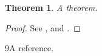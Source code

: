 \documentclass{article}
\newtheorem{theorem}{Theorem}
\begin{document}
\begin{theorem}\label{t}A theorem.\end{theorem}
\begin{proof}
  See \cite[pp.~23--27]{knuth}, \cite[Chapters 1---3]{knuth}
  and \cite{knuth}.
\end{proof}
\begin{thebibliography}{9}A reference.\end{thebibliography}
\end{document}

